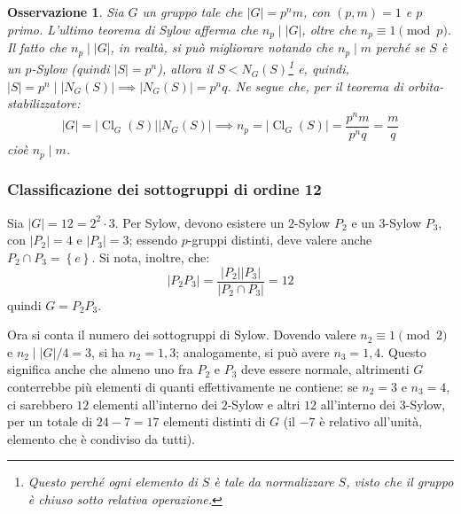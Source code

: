 \documentclass[12pt]{scrartcl}
\theoremstyle{style}
\newtheorem{osservazione}{Osservazione}[section]
\numberwithin{equation}{subsection}
\begin{document}
\begin{osservazione}
Sia $G$ un gruppo tale che $\lvert G \rvert =p^n m $, con $(p,m)= 1$ e $p$ primo. L'ultimo teorema di Sylow afferma che $n_p  \mid \lvert G \rvert$, oltre che $n_p \equiv 1 \pmod{p} $.
Il fatto che $n_p  \mid |G|$, in realt\`a, si pu\`o migliorare notando che $n_p  \mid  m$ perch\'e se $S$ \`e un $p$-Sylow (quindi $\lvert S \rvert =p^n$), allora il $S < N_G(S)$\footnote{Questo perch\'e ogni elemento di $S$ \`e tale da normalizzare $S$, visto che il gruppo \`e chiuso sotto relativa operazione.} e, quindi, $\lvert S \rvert = p^n  \mid \lvert N_G(S) \rvert \implies \lvert N_G(S) \rvert = p^n q$.
Ne segue che, per il teorema di orbita-stabilizzatore:
\[
\lvert G \rvert  = \lvert \operatorname{Cl} _G(S)  \rvert \lvert N_G(S) \rvert \implies n_p = \lvert \operatorname{Cl} _G(S) \rvert = \frac{p^n m}{p^n q} = \frac{m}{q}
\] 
cio\`e $n_p  \mid m$.
\end{osservazione}
\subsubsection{Classificazione dei sottogruppi di ordine 12}
	Sia $\lvert G \rvert = 12 = 2^2 \cdot 3$. 
	Per Sylow, devono esistere un $2$-Sylow $P_2$ e un $3$-Sylow $P_3$, con $\lvert P_2 \rvert =4$ e $\lvert P_3 \rvert =3$; essendo $p$-gruppi distinti, deve valere anche $P_2\cap P_3 = \left\{ e \right\} $.
	Si nota, inoltre, che:
	\[
	\lvert P_2P_3 \rvert = \frac{\lvert P_2 \rvert \lvert P_3 \rvert }{\lvert P_2 \cap P_3\rvert} = 12
	\] 
	quindi $G = P_2P_3$.
	
	Ora si conta il numero dei sottogruppi di Sylow.
	Dovendo valere $n_2\equiv 1 \pmod{2} $ e $n_2  \mid |G| / 4 = 3$, si ha $n_2 = 1, 3$; analogamente, si pu\`o avere $n_3 = 1,4$.
	Questo significa anche che almeno uno fra $P_2$ e $ P_3$ deve essere normale, altrimenti $G$ conterrebbe pi\`u elementi di quanti effettivamente ne contiene: se $n_2 = 3$ e $n_3=4$, ci sarebbero $12$ elementi all'interno dei $2$-Sylow e altri $12$ all'interno dei $3$-Sylow, per un totale di $24-7 = 17$ elementi distinti di $G$ (il $-7$ \`e relativo all'unit\`a, elemento che \`e condiviso da tutti).
\end{document}
